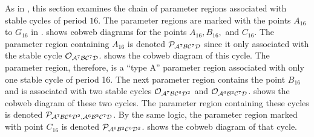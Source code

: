 As in \cite{akyuz2022}, this section examines the chain of parameter regions associated with stable cycles of period $16$.
The parameter regions are marked with the points $A_{16}$ to $G_{16}$ in .
 shows cobweb diagrams for the points $A_{16}, B_{16},$ and $C_{16}$.
The parameter region containing $A_{16}$ is denoted $\mathcal{P}_{\mathcal{A}^7\mathcal{B}\mathcal{C}^7\mathcal{D}}$ since it only associated with the stable cycle $\mathcal{O}_{\mathcal{A}^7\mathcal{B}\mathcal{C}^7\mathcal{D}}$.
 shows the cobweb diagram of this cycle.
The parameter region, therefore, is a ``type A'' parameter region associated with only one stable cycle of period 16.
The next parameter region contains the point $B_{16}$ and is associated with two stable cycles $\mathcal{O}_{\mathcal{A}^7\mathcal{B}\mathcal{C}^6\mathcal{D}^2}$ and $\mathcal{O}_{\mathcal{A}^6\mathcal{B}^2\mathcal{C}^7\mathcal{D}}$.
 shows the cobweb diagram of these two cycles.
The parameter region containing these cycles is denoted $\mathcal{P}_{\mathcal{A}^7\mathcal{B}\mathcal{C}^6\mathcal{D}^2, \mathcal{A}^6\mathcal{B}^2\mathcal{C}^7\mathcal{D}}$.
By the same logic, the parameter region marked with point $C_{16}$ is denoted $\mathcal{P}_{\mathcal{A}^6\mathcal{B}^2\mathcal{C}^6\mathcal{D}^2}$.
 shows the cobweb diagram of that cycle.

